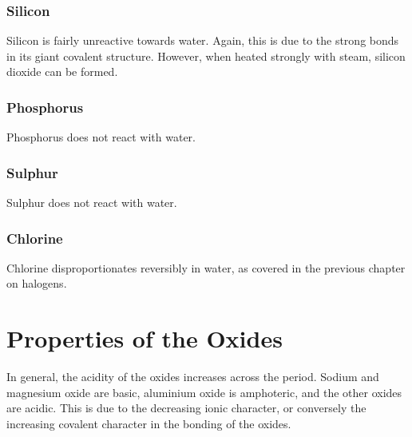 			\subsubsection{Silicon}

				Silicon is fairly unreactive towards water. Again, this is due to the strong bonds in its giant covalent structure.
				However, when heated strongly with steam, silicon dioxide can be formed.



			\subsubsection{Phosphorus}

				Phosphorus does not react with water.


			\subsubsection{Sulphur}

				Sulphur does not react with water.


			\subsubsection{Chlorine}

				Chlorine disproportionates reversibly in water, as covered in the previous chapter on halogens.






	\pagebreak
	\section{Properties of the Oxides}

		In general, the acidity of the oxides increases across the period. Sodium and magnesium oxide are basic, aluminium oxide is
		amphoteric, and the other oxides are acidic. This is due to the decreasing ionic character, or conversely the increasing
		covalent character in the bonding of the oxides.

